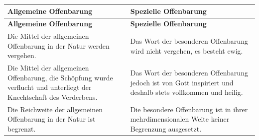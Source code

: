 \begin{longtable}{p{8cm} p{8cm}}
    \hline
    \textbf{Allgemeine Offenbarung} &	\textbf{Spezielle Offenbarung}\\
    \hline
    \endfirsthead
    \hline
    \textbf{Allgemeine Offenbarung} &	\textbf{Spezielle Offenbarung}\\
    \hline
    \endhead
    Die Mittel der allgemeinen Offenbarung in der Natur werden vergehen.
    & 
    Das Wort der besonderen Offenbarung wird nicht vergehen, es besteht ewig. 
    \\
    \hline
    Die Mittel der allgemeinen Offenbarung, die Schöpfung wurde verflucht und unterliegt der Knechtschaft des Verderbens.
    & 
    Das Wort der besonderen Offenbarung jedoch ist von Gott inspiriert und deshalb stets vollkommen und heilig.
    \\
    \hline
    Die Reichweite der allgemeinen Offenbarung in der Natur ist begrenzt.
    & 
    Die besondere Offenbarung ist in ihrer mehrdimensionalen Weite keiner Begrenzung ausgesetzt.
    \\
    \hline
\end{longtable}